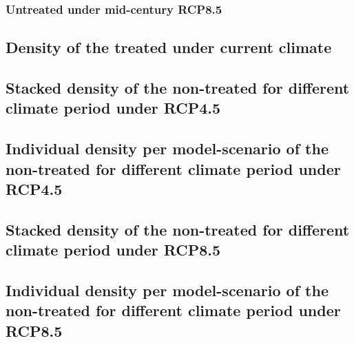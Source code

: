 \documentclass[12pt]{article}
\begin{document}
\subsubsection{Untreated under mid-century RCP8.5}




\subsection{Density of the treated under current climate}

\subsection{Stacked density of the non-treated for different climate period under RCP4.5}

\subsection{Individual density per model-scenario of the non-treated for different
  climate period under RCP4.5}

\subsection{Stacked density of the non-treated for different climate period under RCP8.5}

\subsection{Individual density per model-scenario of the non-treated for different
  climate period under RCP8.5}


% 
% 
\end{document}
